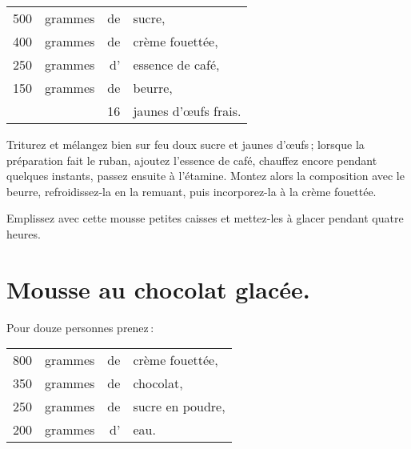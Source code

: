 \footnotesize
\begin{longtable}{rrrp{16em}}
    500 & grammes & de & sucre,                                                                           \\
    400 & grammes & de & crème fouettée,                                                                  \\
    250 & grammes & d' & essence de café,                                                                 \\
    150 & grammes & de & beurre,                                                                          \\
        &         & 16 & jaunes d'œufs frais.                                                             \\
\end{longtable}
\normalsize

Triturez et mélangez bien sur feu doux sucre et jaunes d'œufs ; lorsque la
préparation fait le ruban, ajoutez l'essence de café, chauffez encore pendant
quelques instants, passez ensuite à l’étamine. Montez alors la composition avec
le beurre, refroidissez-la en la remuant, puis incorporez-la à la crème
fouettée.

Emplissez avec cette mousse {\mmm} petites caisses et mettez-les à glacer
pendant quatre heures.

\section*{\centering Mousse au chocolat glacée.}
{}

Pour douze personnes prenez :

\footnotesize
\begin{longtable}{rrrp{16em}}
    800 & grammes & de & crème fouettée,                                                                  \\
    350 & grammes & de & chocolat,                                                                        \\
    250 & grammes & de & sucre en poudre,                                                                 \\
    200 & grammes & d' & eau.                                                                             \\
\end{longtable}
\normalsize

